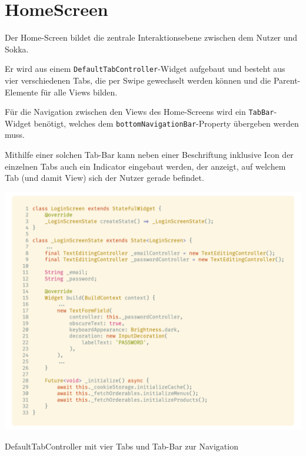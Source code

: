 \section{HomeScreen}

Der Home-Screen bildet die zentrale Interaktionsebene zwischen dem Nutzer und Sokka.

Er wird aus einem \lstinline{DefaultTabController}-Widget aufgebaut und besteht aus vier
verschiedenen Tabs, die per Swipe gewechselt werden können und die Parent-Elemente
für alle Views bilden.

Für die Navigation zwischen den Views des Home-Screens wird ein \lstinline{TabBar}-Widget
benötigt, welches dem \lstinline{bottomNavigationBar}-Property übergeben werden muss.

Mithilfe einer solchen Tab-Bar kann neben einer Beschriftung inklusive Icon
der einzelnen Tabs auch ein Indicator eingebaut werden, der anzeigt, auf welchem Tab (und damit View)
sich der Nutzer gerade befindet.

\begin{code}[h]
    \centering
    \includegraphics[width=1\textwidth]{images/Client/screens/home/tabbar.png}
    \caption{DefaultTabController mit vier Tabs und Tab-Bar zur Navigation}
\end{code}
